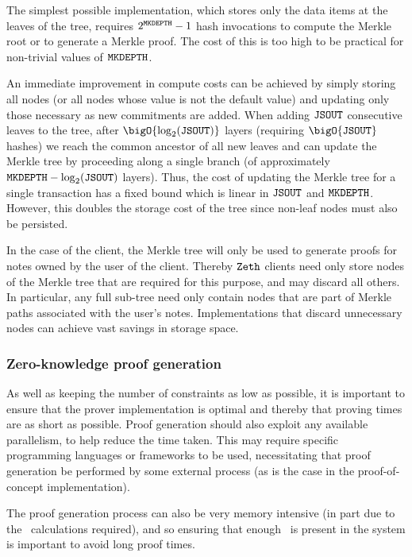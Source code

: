 The simplest possible implementation, which stores only the data items at the leaves of the tree, requires $2^{\mathtt{MKDEPTH}} - 1$ hash invocations to compute the Merkle root or to generate a Merkle proof. The cost of this is too high to be practical for non-trivial values of $\mathtt{MKDEPTH}$.

An immediate improvement in compute costs can be achieved by simply storing all nodes (or all nodes whose value is not the default value) and updating only those necessary as new commitments are added. When adding $\mathtt{JSOUT}$ consecutive leaves to the tree, after $\bigO{\log_2(\jsout)}$ layers (requiring $\bigO{\jsout}$ hashes) we reach the common ancestor of all new leaves and can update the Merkle tree by proceeding along a single branch (of approximately $\mathtt{MKDEPTH} - \log_2(\mathtt{JSOUT})$ layers). Thus, the cost of updating the Merkle tree for a single transaction has a fixed bound which is linear in $\mathtt{JSOUT}$ and $\mathtt{MKDEPTH}$. However, this doubles the storage cost of the tree since non-leaf nodes must also be persisted.

In the case of the client, the Merkle tree will only be used to generate proofs for notes owned by the user of the client. Thereby $\texttt{Zeth}{}$ clients need only store nodes of the Merkle tree that are required for this purpose, and may discard all others. In particular, any full sub-tree need only contain nodes that are part of Merkle paths associated with the user's notes. Implementations that discard unnecessary nodes can achieve vast savings in storage space.

\subsubsection{Zero-knowledge proof generation}

As well as keeping the number of constraints as low as possible, it is important to ensure that the prover implementation is optimal and thereby that proving times are as short as possible. Proof generation should also exploit any available parallelism, to help reduce the time taken. This may require specific programming languages or frameworks to be used, necessitating that proof generation be performed by some external process (as is the case in the proof-of-concept implementation).

The proof generation process can also be very memory intensive (in part due to the \fft~calculations required), and so ensuring that enough \ram~is present in the system is important to avoid long proof times.

